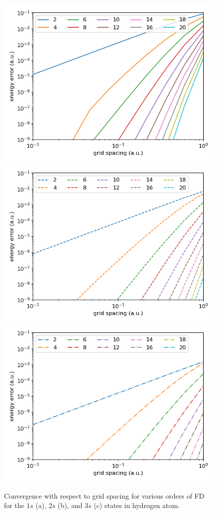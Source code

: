 \begin{figure}[!ht]
\centering
\includegraphics[width=0.32\columnwidth]{figs/1s_conv.png}
\includegraphics[width=0.32\columnwidth]{figs/2s_conv.png}
\includegraphics[width=0.32\columnwidth]{figs/3s_conv.png}
\caption{\label{fig:order_convergence} Convergence with respect to grid spacing for various orders of FD for the $1s$ (a), $2s$ (b), and $3s$ (c) states in hydrogen atom.
}
\end{figure}

